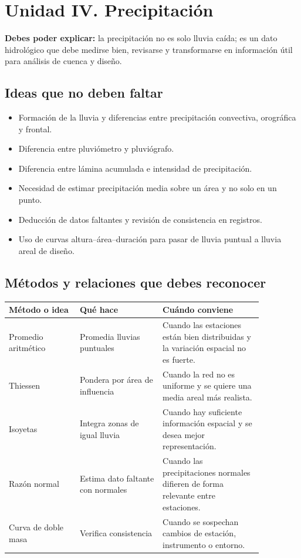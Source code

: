 \documentclass[11pt]{article}
\begin{document}
\section{Unidad IV. Precipitación}
\begin{conceptbox}
\textbf{Debes poder explicar:} la precipitación no es solo lluvia caída; es un dato hidrológico que debe medirse bien, revisarse y transformarse en información útil para análisis de cuenca y diseño.
\end{conceptbox}

\subsection{Ideas que no deben faltar}
\begin{itemize}
\item Formación de la lluvia y diferencias entre precipitación convectiva, orográfica y frontal.
\item Diferencia entre pluviómetro y pluviógrafo.
\item Diferencia entre lámina acumulada e intensidad de precipitación.
\item Necesidad de estimar precipitación media sobre un área y no solo en un punto.
\item Deducción de datos faltantes y revisión de consistencia en registros.
\item Uso de curvas altura--área--duración para pasar de lluvia puntual a lluvia areal de diseño.
\end{itemize}

\subsection{Métodos y relaciones que debes reconocer}
\begin{center}
\begin{tabular}{p{0.24\linewidth} p{0.28\linewidth} p{0.34\linewidth}}
\toprule
\textbf{Método o idea} & \textbf{Qué hace} & \textbf{Cuándo conviene} \\
\midrule
Promedio aritmético & Promedia lluvias puntuales & Cuando las estaciones están bien distribuidas y la variación espacial no es fuerte. \\
Thiessen & Pondera por área de influencia & Cuando la red no es uniforme y se quiere una media areal más realista. \\
Isoyetas & Integra zonas de igual lluvia & Cuando hay suficiente información espacial y se desea mejor representación. \\
Razón normal & Estima dato faltante con normales & Cuando las precipitaciones normales difieren de forma relevante entre estaciones. \\
Curva de doble masa & Verifica consistencia & Cuando se sospechan cambios de estación, instrumento o entorno. \\
\bottomrule
\end{tabular}
\end{center}
\end{document}
